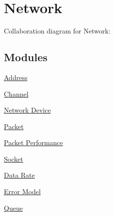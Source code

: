 \hypertarget{group__network}{}\section{Network}
\label{group__network}
Collaboration diagram for Network\+:
\subsection*{Modules}
\begin{DoxyCompactItemize}
\item 
\hyperlink{group__address}{Address}
\item 
\hyperlink{group__channel}{Channel}
\item 
\hyperlink{group__netdevice}{Network Device}
\item 
\hyperlink{group__packet}{Packet}
\item 
\hyperlink{group__packetperf}{Packet Performance}
\item 
\hyperlink{group__socket}{Socket}
\item 
\hyperlink{group__datarate}{Data Rate}
\item 
\hyperlink{group__errormodel}{Error Model}
\item 
\hyperlink{group__queue}{Queue}
\end{DoxyCompactItemize}
